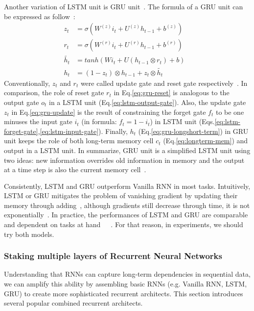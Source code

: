 \label{sec:GRU}
Another variation of LSTM unit is GRU unit~\cite{GRU}.
The formula of a  GRU unit can be expressed as follow~\cite{colah-lsmt}:
\begin{align}
    z_t &= \sigma(W^{(z)}i_t + U^{(z)}h_{t-1} + b^{(z)}) \label{eq:gru-update}&\\
      r_t &= \sigma(W^{(r)}i_t + U^{(r)}h_{t-1} + b^{(r)}) \label{eq:gru-reset}&\\
      \tilde{h_t} &= tanh(Wi_t + U(h_{t-1} \otimes r_t) + b) &\\
      h_t &= (1-z_t) \otimes h_{t-1} + z_t \otimes \tilde{h_t} \label{eq:gru-longshort-term}&
\end{align}
Conventionally, \(z_t\) and \(r_t\) were called update gate and reset gate respectively~\cite{GRU}.
In comparison, the role of reset gate \(r_t\) in Eq.\ref{eq:gru-reset} is analogous to the output gate \(o_t\) in a LSTM unit (Eq.\ref{eq:lstm-output-gate}).
Also, the update gate \(z_t\) in Eq.\ref{eq:gru-update} is the result of constraining the forget gate \(f_t\) to be one minuses the input gate \(i_t\) (in formula: \(f_t = 1-i_t\)) in LSTM unit (Eqs.\ref{eq:lstm-forget-gate},\ref{eq:lstm-input-gate}).
Finally, \(h_t\) (Eq.\ref{eq:gru-longshort-term}) in GRU unit keeps the role of both long-term memory cell \(c_t\) (Eq.\ref{eq:longterm-mem}) and output in a LSTM unit.
In summarize, GRU unit is a simplified LSTM unit using two ideas: new information overrides old information in memory and the output at a time step is also the current memory cell~\cite{evaluate-GRU}.

Consistently, LSTM and GRU outperform Vanilla RNN in most tasks.
Intuitively, LSTM or GRU mitigates the problem of vanishing gradient by updating their memory through adding~\cite{evaluate-GRU}, although gradients still decrease through time, it is not exponentially~\cite{Graves-thesis}.
In practice, the performances of LSTM and GRU are comparable and dependent on tasks at hand~\cite{understand-lstm}~\cite{evaluate-GRU}~\cite{lstm-search}.
For that reason, in experiments, we should try both models.

\subsubsection{Staking multiple layers of Recurrent Neural Networks}
Understanding that RNNs can capture long-term dependencies in sequential data, we can amplify this ability by assembling basic RNNs (e.g. Vanilla RNN, LSTM, GRU) to create more sophisticated recurrent architects.
This section introduces several popular combined recurrent architects.

